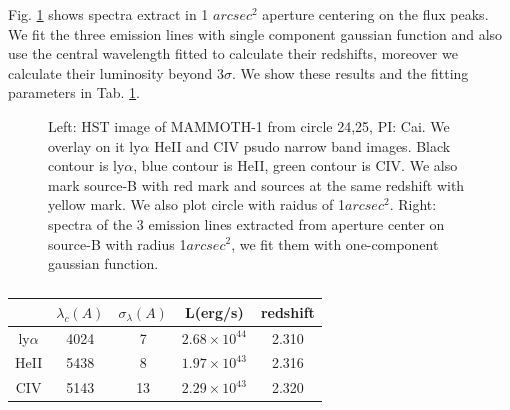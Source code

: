 \documentclass[../Results.tex]{subfiles}
\begin{document}
	Fig. \ref{overlayspec} shows spectra extract in 1 $arcsec^{2}$ aperture centering on the flux peaks. We fit the three emission lines with single component gaussian function and also use the central wavelength fitted to calculate their redshifts, moreover we calculate their luminosity beyond $3\sigma$. We show these results and the fitting parameters in Tab. \ref{fit_L}. 
	\begin{figure}
		\centering
		\label{overlayspec}
		\caption{Left: HST image of MAMMOTH-1 from circle 24,25, PI: Cai. We overlay on it ly$\alpha$ HeII and CIV psudo narrow band images. Black contour is ly$\alpha$, blue contour is HeII, green contour is CIV. We also mark source-B with red mark and sources at the same redshift with yellow mark. We also plot circle with raidus of 1$arcsec^{2}$. Right: spectra of the 3 emission lines extracted from aperture center on source-B with radius 1$arcsec^{2}$, we fit them with one-component gaussian function.}
	\end{figure}
	\begin{table}[htp]
	\begin{center}
		\begin{tabular}{ccccc}
\hline
\hline
& $\lambda_{c}(A)$ & $\sigma_{\lambda}(A)$ & L(erg/s) & redshift \\ \hline
ly$\alpha$ &   4024  &     7  &   $2.68 \times 10^{44}$ & 2.310        \\
HeII       &   5438  &     8  &   $1.97 \times 10^{43}$ & 2.316        \\
CIV        &   5143  &     13 &   $2.29 \times 10^{43}$ & 2.320        \\ \hline
\end{tabular}
\end{center}
	\caption{}
	\label{fit_L}
	\end{table}
\end{document}
